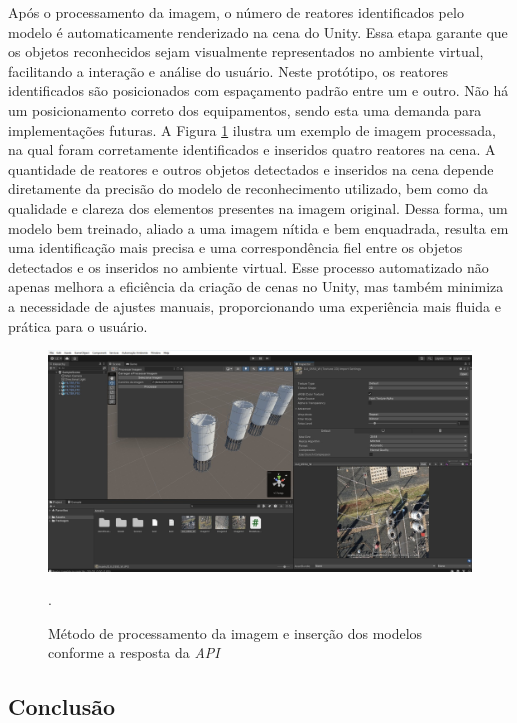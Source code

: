 Após o processamento da imagem, o número de reatores identificados pelo modelo é automaticamente renderizado na cena do Unity. Essa etapa garante que os objetos reconhecidos sejam visualmente representados no ambiente virtual, facilitando a interação e análise do usuário. Neste protótipo, os reatores identificados são posicionados com espaçamento padrão entre um e outro. Não há um posicionamento correto dos equipamentos, sendo esta uma demanda para implementações futuras. A Figura \ref{fig:predict} ilustra um exemplo de imagem processada, na qual foram corretamente identificados e inseridos quatro reatores na cena. A quantidade de reatores e outros objetos detectados e inseridos na cena depende diretamente da precisão do modelo de reconhecimento utilizado, bem como da qualidade e clareza dos elementos presentes na imagem original. Dessa forma, um modelo bem treinado, aliado a uma imagem nítida e bem enquadrada, resulta em uma identificação mais precisa e uma correspondência fiel entre os objetos detectados e os inseridos no ambiente virtual. Esse processo automatizado não apenas melhora a eficiência da criação de cenas no Unity, mas também minimiza a necessidade de ajustes manuais, proporcionando uma experiência mais fluida e prática para o usuário.

\begin{figure}[!h]
    \centering
    \begin{minipage}{0.9\linewidth}
    \centering
    \captionsetup{justification=centering,margin=0.5cm,font=small}
    \includegraphics[width=1\linewidth]{img/cap5/predict.jpeg}
    \caption{Método de processamento da imagem e inserção dos modelos conforme a resposta da \textit{API}}.
    \label{fig:predict}
    \end{minipage}
\end{figure}

\subsection{Conclusão}

